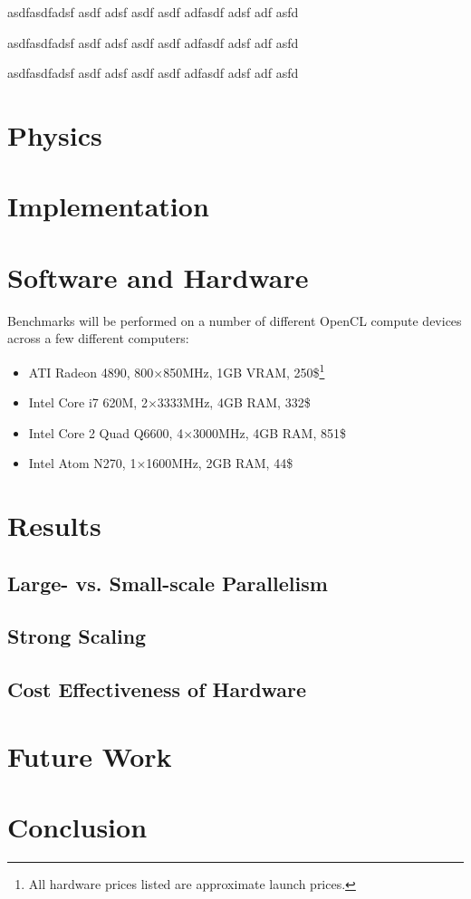 \documentclass{acmsiggraph}
\begin{document}
asdfasdfadsf asdf adsf asdf asdf adfasdf adsf adf asfd

asdfasdfadsf asdf adsf asdf asdf adfasdf adsf adf asfd

asdfasdfadsf asdf adsf asdf asdf adfasdf adsf adf asfd

\section{Physics}

\section{Implementation}

\section{Software and Hardware}

Benchmarks will be performed on a number of different OpenCL compute devices across a few different computers:

\begin{itemize}

\item ATI Radeon 4890, 800$\times$850MHz, 1GB VRAM, 250\$\footnote{All hardware prices listed are approximate launch prices.\label{fn:prices}}

\item Intel Core i7 620M, 2$\times$3333MHz, 4GB RAM, 332\$

\item Intel Core 2 Quad Q6600, 4$\times$3000MHz, 4GB RAM, 851\$

\item Intel Atom N270, 1$\times$1600MHz, 2GB RAM, 44\$

\end{itemize}

\section{Results}

\subsection{Large- vs. Small-scale Parallelism}

\subsection{Strong Scaling}

\subsection{Cost Effectiveness of Hardware}

\section{Future Work}

\section{Conclusion}


\nocite{*}

\end{document}
